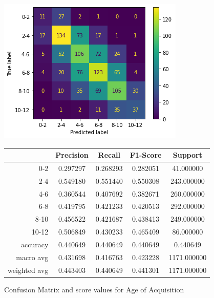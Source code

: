 \documentclass[a4paper,11pt,dvipsnames]{article}
\begin{document}
\begin{figure}[h]
  \begin{minipage}{.4\linewidth}
    \centering
    \includegraphics[width=\textwidth]{aoa_multi_confusion_matrix.png}%
  \end{minipage}
  \begin{minipage}{.2\linewidth}
    \centering
\begin{tabular}{|r|c|c|c|c|}
\toprule
{} &  Precision &    Recall &  F1-Score &      Support \\
\midrule\midrule
0-2          &   0.297297 &  0.268293 &  0.282051 &    41.000000 \\
2-4          &   0.549180 &  0.551440 &  0.550308 &   243.000000 \\
4-6          &   0.360544 &  0.407692 &  0.382671 &   260.000000 \\
6-8          &   0.419795 &  0.421233 &  0.420513 &   292.000000 \\
8-10          &   0.456522 &  0.421687 &  0.438413 &   249.000000 \\
10-12         &   0.506849 &  0.430233 &  0.465409 &    86.000000 \\
accuracy     &   0.440649 &  0.440649 &  0.440649 &     0.440649 \\
macro avg    &   0.431698 &  0.416763 &  0.423228 &  1171.000000 \\
weighted avg &   0.443403 &  0.440649 &  0.441301 &  1171.000000 \\
\bottomrule
\end{tabular}

  \end{minipage}
  
  \caption{Confusion Matrix and score values for Age of Acquisition} \label{aoa_multi}
\end{figure}
\end{document}
